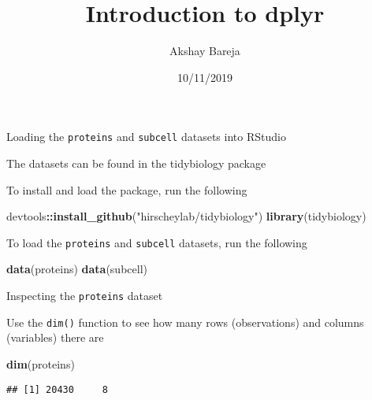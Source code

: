 \documentclass[ignorenonframetext,]{beamer}
\title{Introduction to dplyr}
\author{Akshay Bareja}
\date{10/11/2019}
\newenvironment{Shaded}{\begin{snugshade}}{\end{snugshade}}
\newcommand{\KeywordTok}[1]{\textcolor[rgb]{0.13,0.29,0.53}{\textbf{#1}}}
\newcommand{\NormalTok}[1]{#1}
\newcommand{\OperatorTok}[1]{\textcolor[rgb]{0.81,0.36,0.00}{\textbf{#1}}}
\newcommand{\StringTok}[1]{\textcolor[rgb]{0.31,0.60,0.02}{#1}}
\begin{document}
\frame{\titlepage}

\begin{frame}[fragile]{Loading the \texttt{proteins} and
\texttt{subcell} datasets into RStudio}
\protect\hypertarget{loading-the-proteins-and-subcell-datasets-into-rstudio}{}

The datasets can be found in the tidybiology package

To install and load the package, run the following

\begin{Shaded}
\begin{Highlighting}[]
\NormalTok{devtools}\OperatorTok{::}\KeywordTok{install_github}\NormalTok{(}\StringTok{"hirscheylab/tidybiology"}\NormalTok{)}
\KeywordTok{library}\NormalTok{(tidybiology)}
\end{Highlighting}
\end{Shaded}

To load the \texttt{proteins} and \texttt{subcell} datasets, run the
following

\begin{Shaded}
\begin{Highlighting}[]
\KeywordTok{data}\NormalTok{(proteins)}
\KeywordTok{data}\NormalTok{(subcell)}
\end{Highlighting}
\end{Shaded}

\end{frame}

\begin{frame}[fragile]{Inspecting the \texttt{proteins} dataset}
\protect\hypertarget{inspecting-the-proteins-dataset}{}

Use the \texttt{dim()} function to see how many rows (observations) and
columns (variables) there are

\begin{Shaded}
\begin{Highlighting}[]
\KeywordTok{dim}\NormalTok{(proteins)}
\end{Highlighting}
\end{Shaded}

\begin{verbatim}
## [1] 20430     8
\end{verbatim}

\end{frame}
\end{document}
